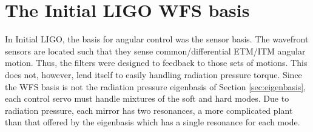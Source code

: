










\section{The Initial LIGO WFS basis}
In Initial LIGO, the basis for angular control was the sensor
basis. The wavefront sensors are located such that they sense
common/differential ETM/ITM angular motion. Thus, the filters were
designed to feedback to those sets of motions. This does not, however,
lend itself to easily handling radiation pressure torque. Since the
WFS basis is not the radiation pressure eigenbasis of Section
\ref{sec:eigenbasis}, each control servo must handle mixtures of the
soft and hard modes. Due to radiation pressure, each mirror has two
resonances, a more complicated plant than that offered by the
eigenbasis which has a single resonance for each mode. 

